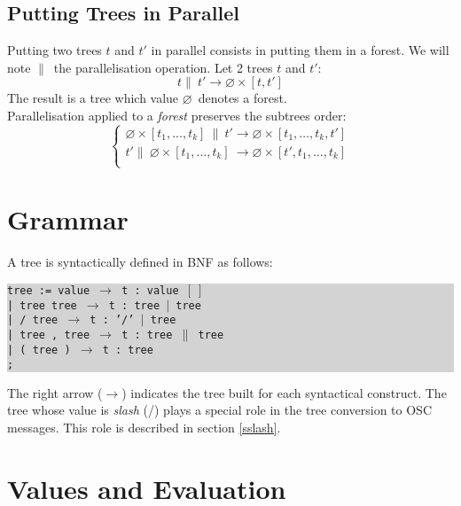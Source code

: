 \documentclass[runningheads,a4paper]{llncs}
\newcommand{\code}	[2][0.9]	{\vspace{0mm}\begin{center}\colorbox{lightgrey}{
							\begin{minipage}[t]{#1\columnwidth} 
							{\small \texttt{#2}}
							\end{minipage}}\end{center}}
\newcommand{\llist}	[1]		{\ensuremath{[#1_1,...,#1_k]}}
\newcommand{\seq}		{\ensuremath{|}}
\newcommand{\paral}		{\ensuremath{\parallel}}
\newcommand{\forest}	{\ensuremath{\varnothing}}
\newcommand{\etc}		{\ensuremath{\text{…}}}
\newcommand{\emptyf}	{\ensuremath{[\ ]}}
\newcommand{\ula}		{\hspace*{8mm}}
\begin{document}
\subsection{Putting Trees in Parallel}
Putting two trees $t$ and $t'$ in parallel consists in putting them in a forest.
We will note \paral\ the parallelisation operation. 
Let 2 trees $t$ and $t'$:
\[
	t \paral\ t'  \to  \forest \times [ t, t' ]
\]
The result is a tree which value \forest\ denotes a forest. \\
Parallelisation applied to a \emph{forest} preserves the subtrees order:
\[
\left\{
\begin{array}{l}
	\forest \times \llist{t}\  \paral\ t'  \to  \forest \times [t_1,\etc,t_k,t']\\
	t' \paral\ \forest \times \llist{t}\   \to  \forest \times [t',t_1,\etc,t_k]\\
\end{array}
\right.
\]


\section{Grammar}\label{agram}

A tree is syntactically defined in BNF as follows:
\code{tree := value      \hspace*{8mm} $\to$ t : value \emptyf \\
\ula | tree tree         \hspace*{4mm} $\to$ t : tree \seq\ tree \\
\ula | / tree            \hspace*{9.7mm} $\to$ t : '/' \seq\ tree\\
\ula | tree , tree       \hspace*{0mm}  $\to$ t : tree \paral\ tree \\
\ula | ( tree )          \hspace*{6mm} $\to$ t : tree \\
\ula ;
}
The right arrow ($\to$) indicates the tree built for each syntactical construct. 
The tree whose value is \emph{slash} (/) plays a special role in the tree conversion to OSC messages. This role is described in section \ref{sslash}.


\section{Values and Evaluation}\label{sec:valeurs}
\end{document}
